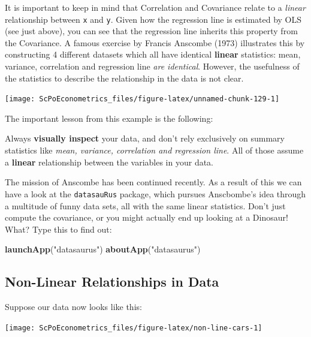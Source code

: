 \documentclass[]{book}
\newenvironment{Shaded}{\begin{snugshade}}{\end{snugshade}}
\newcommand{\KeywordTok}[1]{\textcolor[rgb]{0.13,0.29,0.53}{\textbf{#1}}}
\newcommand{\NormalTok}[1]{#1}
\newcommand{\StringTok}[1]{\textcolor[rgb]{0.31,0.60,0.02}{#1}}
\newenvironment{warning}{\begin{tcolorbox}[colback=orange!5!white,colframe=orange]}{\end{tcolorbox}}
\begin{document}
It is important to keep in mind that Correlation and Covariance relate to a \emph{linear} relationship between \texttt{x} and \texttt{y}. Given how the regression line is estimated by OLS (see just above), you can see that the regression line inherits this property from the Covariance.
A famous exercise by Francis Anscombe (1973) illustrates this by constructing 4 different datasets which all have identical \textbf{linear} statistics: mean, variance, correlation and regression line \emph{are identical}. However, the usefulness of the statistics to describe the relationship in the data is not clear.

\begin{center}\texttt{[image: ScPoEconometrics\_files/figure-latex/unnamed-chunk-129-1]} \end{center}

The important lesson from this example is the following:

\begin{warning}
Always \textbf{visually inspect} your data, and don't rely exclusively
on summary statistics like \emph{mean, variance, correlation and
regression line}. All of those assume a \textbf{linear} relationship
between the variables in your data.
\end{warning}

The mission of Anscombe has been continued recently. As a result of this we can have a look at the \texttt{datasauRus} package, which pursues Anscbombe's idea through a multitude of funny data sets, all with the same linear statistics. Don't just compute the covariance, or you might actually end up looking at a Dinosaur! What? Type this to find out:

\begin{Shaded}
\begin{Highlighting}[]
\KeywordTok{launchApp}\NormalTok{(}\StringTok{"datasaurus"}\NormalTok{)}
\KeywordTok{aboutApp}\NormalTok{(}\StringTok{"datasaurus"}\NormalTok{)}
\end{Highlighting}
\end{Shaded}

\hypertarget{non-linear-relationships-in-data}{%
\subsection{Non-Linear Relationships in Data}\label{non-linear-relationships-in-data}}

Suppose our data now looks like this:

\begin{center}\texttt{[image: ScPoEconometrics\_files/figure-latex/non-line-cars-1]} \end{center}
\end{document}

